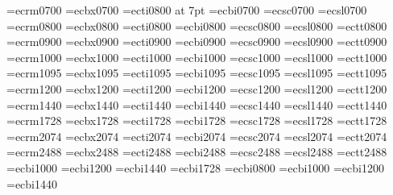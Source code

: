 \font\sevenrm=ecrm0700
\font\sevenbf=ecbx0700
\font\sevenit=ecti0800 at 7pt
\font\sevenbi=ecbi0700
\font\sevensc=ecsc0700
\font\sevensl=ecsl0700
%
\font\eightrm=ecrm0800
\font\eightbf=ecbx0800
\font\eightit=ecti0800
\font\eightbi=ecbi0800
\font\eightsc=ecsc0800
\font\eightsl=ecsl0800 
\font\eighttt=ectt0800
%
\font\ninerm=ecrm0900
\font\ninebf=ecbx0900
\font\nineit=ecti0900
\font\ninebi=ecbi0900
\font\ninesc=ecsc0900
\font\ninesl=ecsl0900
\font\ninett=ectt0900
%
\font\tenrm=ecrm1000
\font\tenbf=ecbx1000
\font\tenit=ecti1000
\font\tenbi=ecbi1000
\font\tensc=ecsc1000
\font\tensl=ecsl1000
\font\tentt=ectt1000
%
\font\elevenrm=ecrm1095
\font\elevenbf=ecbx1095
\font\elevenit=ecti1095
\font\elevenbi=ecbi1095
\font\elevensc=ecsc1095
\font\elevensl=ecsl1095
\font\eleventt=ectt1095
%
\font\twelverm=ecrm1200
\font\twelvebf=ecbx1200
\font\twelveit=ecti1200
\font\twelvebi=ecbi1200
\font\twelvesc=ecsc1200
\font\twelvesl=ecsl1200
\font\twelvett=ectt1200
%
\font\frtrm=ecrm1440
\font\frtbf=ecbx1440
\font\frtit=ecti1440
\font\frtbi=ecbi1440
\font\frtsc=ecsc1440
\font\frtsl=ecsl1440
\font\frttt=ectt1440
%
\font\svtrm=ecrm1728
\font\svtbf=ecbx1728
\font\svtit=ecti1728
\font\svtbi=ecbi1728
\font\svtsc=ecsc1728
\font\svtsl=ecsl1728
\font\svttt=ectt1728
%
\font\twtyrm=ecrm2074
\font\twtybf=ecbx2074
\font\twtyit=ecti2074
\font\twtybi=ecbi2074
\font\twtysc=ecsc2074
\font\twtysl=ecsl2074
\font\twtytt=ectt2074
%
\font\twfvrm=ecrm2488
\font\twfvbf=ecbx2488
\font\twfvit=ecti2488
\font\twfvbi=ecbi2488
\font\twfvsc=ecsc2488
\font\twfvsl=ecsl2488
\font\twfvtt=ectt2488
%
\let\bigfont=\frtbf
\let\Bigfont=\svtbf
\let\BIgfont=\twtybf
\let\BIGfont=\twfvbf
%
%
\font\ppffsixteen=ecbi1000
\font\ppfftwenty=ecbi1200
\font\ppfftwentyfour=ecbi1440
\font\ppfftwentynine=ecbi1728
\font\tinyppff=ecbi0800
\font\smallppff=ecbi1000
\font\normppff=ecbi1200
\font\medppff=ecbi1440
%
\def\smalltype{%
  \let\rm\eightrm
  \let\bf\eightbf
  \let\it\eightit
  \let\bi\eightbi
  \let\sc\eightsc
  \let\sl\eightsl
  \rm}
\def\Smalltype{%
  \let\rm\ninerm
  \let\bf\ninebf
  \let\it\nineit
  \let\bi\ninebi
  \let\sc\ninesc
  \let\sl\ninesl
  \rm}
\def\normtype{%
  \let\rm\tenrm
  \let\bf\tenbf
  \let\it\tenit
  \let\bi\tenbi
  \let\sc\tensc
  \let\sl\tensl
  \rm}
\def\medtype{%
  \let\rm\twelverm
  \let\bf\twelvebf
  \let\it\twelveit
  \let\bi\twelvebi
  \let\sc\twelvesc
  \let\sl\twelvesl
  \rm}
\def\bigtype{%
  \let\rm\bigfont
  \let\bf\bigfont
  \let\it\bigfont
  \let\bi\bigfont
  \let\sc\bigfont
  \let\sl\bigfont
  \bf}
\def\Bigtype{%
  \let\rm\Bigfont
  \let\bf\Bigfont
  \let\it\Bigfont
  \let\bi\Bigfont
  \let\sc\Bigfont
  \let\sl\Bigfont
  \bf}
\def\BIgtype{%
  \let\rm\BIgfont
  \let\bf\BIgfont
  \let\it\BIgfont
  \let\bi\Bigfont
  \let\sc\Bigfont
  \let\sl\Bigfont
  \bf}
\def\BIGtype{%
  \let\rm\BIGfont
  \let\bf\BIGfont
  \let\it\BIGfont
  \let\bi\BIGfont
  \let\sc\BIGfont
  \let\sl\BIGfont
  \bf}
%
\def\txtfont{\eightit}
\def\txt{\txtfont3}
\def\tuplettxt{\txtfont3}


